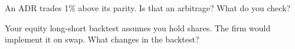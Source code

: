 \begin{interviewq}\label{iq:m1:delta-one-instruments:5}
An ADR trades 1\% above its parity. Is that an arbitrage? What do you check?
\end{interviewq}

\begin{interviewq}\label{iq:m1:delta-one-instruments:6}
Your equity long-short backtest assumes you hold shares. The firm would
implement it on swap. What changes in the backtest?
\end{interviewq}
